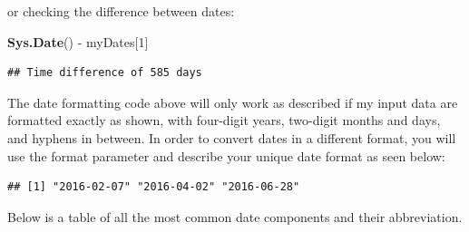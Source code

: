 \documentclass[]{book}
\newenvironment{Shaded}{\begin{snugshade}}{\end{snugshade}}
\newcommand{\KeywordTok}[1]{\textcolor[rgb]{0.13,0.29,0.53}{\textbf{{#1}}}}
\newcommand{\DataTypeTok}[1]{\textcolor[rgb]{0.13,0.29,0.53}{{#1}}}
\newcommand{\DecValTok}[1]{\textcolor[rgb]{0.00,0.00,0.81}{{#1}}}
\newcommand{\StringTok}[1]{\textcolor[rgb]{0.31,0.60,0.02}{{#1}}}
\newcommand{\CommentTok}[1]{\textcolor[rgb]{0.56,0.35,0.01}{\textit{{#1}}}}
\newcommand{\NormalTok}[1]{{#1}}
\begin{document}
or checking the difference between dates:

\begin{Shaded}
\begin{Highlighting}[]
\KeywordTok{Sys.Date}\NormalTok{() -}\StringTok{ }\NormalTok{myDates[}\DecValTok{1}\NormalTok{]}
\end{Highlighting}
\end{Shaded}

\begin{verbatim}
## Time difference of 585 days
\end{verbatim}

The date formatting code above will only work as described if my input
data are formatted exactly as shown, with four-digit years, two-digit
months and days, and hyphens in between. In order to convert dates in a
different format, you will use the format parameter and describe your
unique date format as seen below:

\begin{Shaded}
\end{Shaded}

\begin{verbatim}
## [1] "2016-02-07" "2016-04-02" "2016-06-28"
\end{verbatim}

Below is a table of all the most common date components and their
abbreviation.
\end{document}
